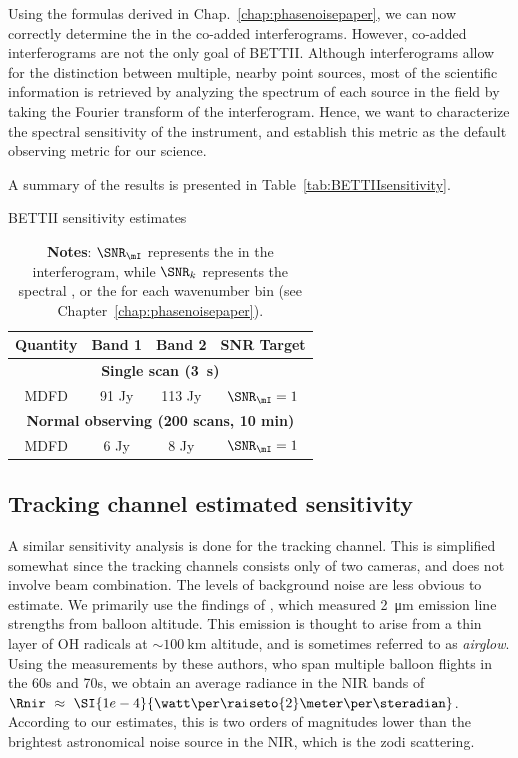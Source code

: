 Using the formulas derived in Chap.~\ref{chap:phasenoisepaper}, we can now correctly determine the \SNR in the co-added interferograms. However, co-added interferograms are not the only goal of BETTII. Although interferograms allow for the distinction between multiple, nearby point sources, most of the scientific information is retrieved by analyzing the spectrum of each source in the field by taking the Fourier transform of the interferogram. Hence, we want to characterize the spectral sensitivity of the instrument, and establish this metric as the default observing metric for our science.

A summary of the results is presented in Table~\ref{tab:BETTIIsensitivity}.

\begin{table}[ht!]
\begin{center}
\caption{BETTII sensitivity estimates}
\label{tab:BETTIIsensitivity}
\vspace{-0.5cm}
\begin{longtable}{cccc}
\toprule
  Quantity   & Band 1 &  Band 2 & SNR Target \\
     \midrule 
 \multicolumn{4}{c}{\textbf{Single scan (\SI{3}{\second})}} \\
MDFD & 91 Jy  & 113 Jy & $\SNR_\mI = 1$\\ 
\midrule
\multicolumn{4}{c}{\textbf{Normal observing (200 scans, 10 min)}} \\
MDFD & 6 Jy  & 8 Jy & $\SNR_\mI = 1$\\ 
\bottomrule 
\end{longtable} 
\caption*{\textbf{Notes}: $\SNR_\mI$ represents the \SNR in the interferogram, while $\SNR_k$ represents the spectral \SNR, or the \SNR for each wavenumber bin (see Chapter~\ref{chap:phasenoisepaper}).}
\end{center}
\end{table} 


\subsection{Tracking channel estimated sensitivity}
A similar sensitivity analysis is done for the tracking channel. This is simplified somewhat since the tracking channels consists only of two cameras, and does not involve beam combination. The levels of background noise are less obvious to estimate. We primarily use the findings of \citet{Matsumoto:1994io}, which measured \SI{2}{\micro\meter} emission line strengths from balloon altitude. This emission is thought to arise from a thin layer of OH radicals at $\sim\SI{100}{\kilo\meter}$ altitude, and is sometimes referred to as \textit{airglow}. Using the measurements by these authors, who span multiple balloon flights in the 60s and 70s, we obtain an average radiance in the NIR bands of $\Rnir~\approx~\SI{1e-4}{\watt\per\raiseto{2}\meter\per\steradian}$. According to our estimates, this is two orders of magnitudes lower than the brightest astronomical noise source in the NIR, which is the zodi scattering.

